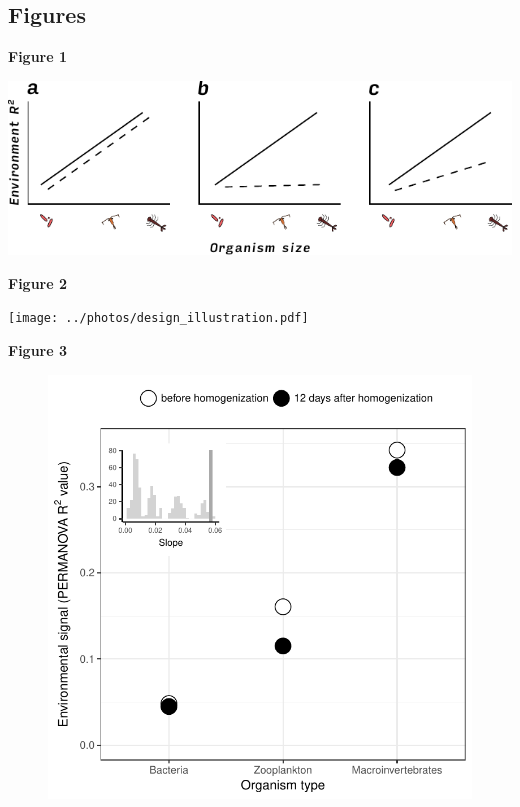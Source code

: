 \documentclass[12pt,]{article}
\begin{document}
\subsection{Figures}\label{figures}

\textbf{Figure 1}

\includegraphics{../photos/hypotheses_illustration.pdf} \newpage

\textbf{Figure 2}

\texttt{[image: ../photos/design\_illustration.pdf]} \newpage

\textbf{Figure 3}

\begin{figure}
\centering
\includegraphics{../figures/r2_plot.pdf}
\caption{}
\end{figure}
\end{document}
